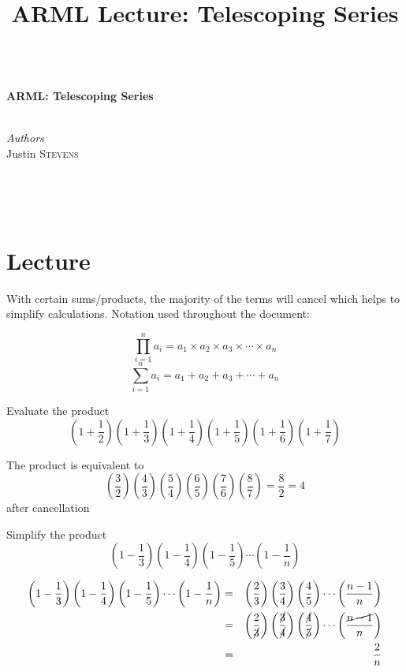 
\title{ARML Lecture:  Telescoping Series}

\begin{center}
\HRule \\[0.4cm]
{ \huge \bfseries ARML: Telescoping Series}\\[0.4cm] %
\HRule \\[1.5cm]
\begin{minipage}{0.4\textwidth}
\begin{flushleft} \large
\emph{Authors}\\
Justin \textsc{Stevens} \newline
\end{flushleft}
\end{minipage}
~
\begin{minipage}{0.4\textwidth}
\begin{flushright} \large

\end{flushright}
\end{minipage}\\[0.5cm]
\end{center}

\section{Lecture}

With certain sums/products, the majority of the terms will cancel which helps to simplify calculations.  Notation used throughout the document:

$$\prod_{i=1}^{n}a_i=a_1\times a_2\times a_3\times \cdots \times a_n$$
$$\sum_{i=1}^{n}a_i=a_1+a_2+a_3+\cdots+a_n$$

\begin{exmp}[Mathcounts]  Evaluate the product $$\left(1+\frac12\right)\left(1+\frac13\right)\left(1+\frac14\right)\left(1+\frac15\right)\left(1+\frac16\right)\left(1+\frac17\right)$$ \end{exmp}
\begin{soln}  
The product is equivalent to $$\left(\frac32\right)\left(\frac43\right)\left(\frac54\right)\left(\frac65\right)\left(\frac76\right)\left(\frac87\right)=\frac{8}{2}=4$$ after cancellation   \end{soln}

\begin{exmp}  Simplify the product $$\left(1-\frac13\right)\left(1-\frac14\right)\left(1-\frac15\right)\cdots\left(1-\frac1n\right)$$ \end{exmp}
\begin{soln}
\begin{eqnarray*}  \left(1-\frac13\right)\left(1-\frac14\right)\left(1-\frac15\right)\cdots \left(1-\frac1n\right) &=& \left(\frac23\right)\left(\frac34\right)\left(\frac45\right)\cdots\left(\frac{n-1}{n}\right) \\ 
&=& \left(\frac{2}{\cancel{3}}\right)\left(\frac{\cancel{3}}{\cancel{4}}\right)\left(\frac{\cancel{4}}{\cancel{5}}\right)\cdots \left(\frac{\cancel{n-1}}n \right) \\ &=& \frac{2}{n} \end{eqnarray*}
\end{soln}

